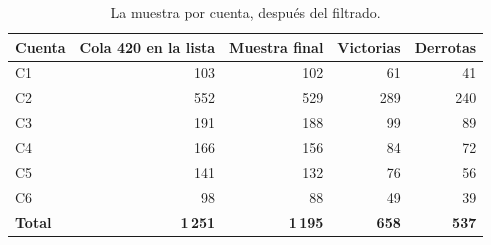 \begin{table}[H]
\centering\small
\caption{La muestra por cuenta, después del filtrado.}
\label{tab:cuentas}
\begin{tabular}{lrrrr}
\toprule
Cuenta & Cola 420 en la lista & Muestra final & Victorias & Derrotas \\
\midrule
C1 & 103 & 102 & 61 & 41 \\
C2 & 552 & 529 & 289 & 240 \\
C3 & 191 & 188 & 99 & 89 \\
C4 & 166 & 156 & 84 & 72 \\
C5 & 141 & 132 & 76 & 56 \\
C6 & 98 & 88 & 49 & 39 \\
\midrule
\textbf{Total} & \textbf{1\,251} & \textbf{1\,195} & \textbf{658} & \textbf{537} \\
\bottomrule
\end{tabular}
\end{table}
